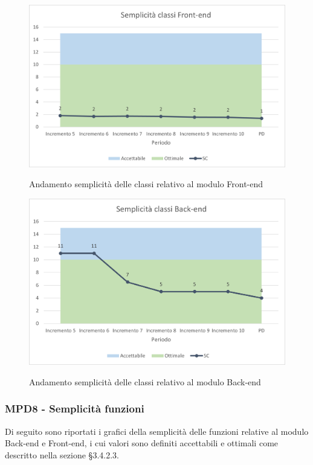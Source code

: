 \begin{figure}[H]
\centering
\includegraphics[scale=0.78]{res/ResocontoAttivitaDiVerifica/res/metriche/grafici/img/SCFE.png}\\
\caption{Andamento semplicità delle classi relativo al modulo Front-end}
\end{figure}

\begin{figure}[H]
\centering
\includegraphics[scale=0.78]{res/ResocontoAttivitaDiVerifica/res/metriche/grafici/img/SCBE.png}\\
\caption{Andamento semplicità delle classi relativo al modulo Back-end}
\end{figure}

\subsubsection{MPD8 - Semplicità funzioni}
Di seguito sono riportati i grafici della semplicità delle funzioni relative al modulo Back-end e Front-end, i cui valori sono definiti accettabili e ottimali come descritto nella sezione §3.4.2.3.\\

